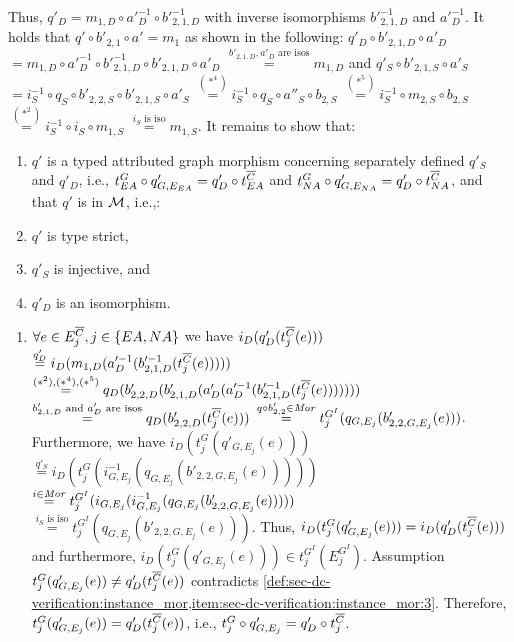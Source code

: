 \begin{description}
\begin{description}
Thus, $q'_D=m_{1,D} \circ a'^{-1}_D \circ b'^{-1}_{2,1,D}$ with inverse isomorphisms $b'^{-1}_{2,1,D}$ and $a'^{-1}_D$.
It holds that $q' \circ b'_{2,1} \circ a'=m_1$ as shown in the following: $q'_D \circ b'_{2,1,D} \circ a'_D$ $=m_{1,D} \circ a'^{-1}_D \circ b'^{-1}_{2,1,D} \circ b'_{2,1,D} \circ a'_D$ $\stackrel{b'_{2,1,D},a'_D\text{ are isos}}{=} m_{1,D}$ and $q'_S \circ b'_{2,1,S} \circ a'_S$ $=i^{-1}_S \circ q_S \circ b'_{2,2,S} \circ b'_{2,1,S} \circ a'_S$ $\stackrel{(*^4)}{=} i^{-1}_S \circ q_S \circ a''_S \circ b_{2,S}$ $\stackrel{(*^5)}{=} i^{-1}_S \circ m_{2,S} \circ b_{2,S}$ $\stackrel{(*^2)}{=} i^{-1}_S \circ i_S \circ m_{1,S}$ $\stackrel{i_S\text{ is iso}}{=} m_{1,S}$.
It remains to show that:
\begin{enumerate}
  \item $q'$ is a typed attributed graph morphism concerning separately defined $q'_S$ and $q'_D$, i.e., $t^G_{EA} \circ q'_{G,E_{EA}}=q'_D \circ t^{\overline{C}}_{EA}$ and $t^G_{NA} \circ q'_{G,E_{NA}}=q'_D \circ t^{\overline{C}}_{NA}$, and that $q'$ is in ${\cal M}$, i.e.,:
  \item $q'$ is type strict,
  \item $q'_S$ is injective, and
  \item $q'_D$ is an isomorphism.
\end{enumerate}
\begin{enumerate}
  \item $\forall e \in E^{\overline{C}}_j,j \in \{EA,NA\}$ we have $i_D(q'_D(t_j^{\overline{C}}(e)))$ $\stackrel{q'_D}{=} i_D(m_{1,D}(a'^{-1}_D(b'^{-1}_{2,1,D}(t_j^{\overline{C}}(e)))))$ $\stackrel{(*^2),(*^4),(*^5)}{=} q_D(b'_{2,2,D}(b'_{2,1,D}(a'_D(a'^{-1}_D(b'^{-1}_{2,1,D}(t_j^{\overline{C}}(e)))))))$ $\stackrel{b'_{2,1,D}\text{ and }a'_D\text{ are isos}}{=} q_D(b'_{2,2,D}(t_j^{\overline{C}}(e)))$ $\stackrel{q \circ b'_{2,2} \in \mathit{Mor}}{=} t_j^{G^I}(q_{G,E_j}(b'_{2,2,G,E_j}(e)))$.
  Furthermore, we have $i_D(t^G_j(q'_{G,E_j}(e)))$ $\stackrel{q'_S}{=} i_D(t^G_j(i^{-1}_{G,E_j}(q_{G,E_j}(b'_{2,2,G,E_j}(e)))))$ $\stackrel{i \in \mathit{Mor}}{=} t^{G^I}_j(i_{G,E_j}(i^{-1}_{G,E_j}(q_{G,E_j}(b'_{2,2,G,E_j}(e)))))$ $\stackrel{i_S\text{ is iso}}{=} t^{G^I}_j(q_{G,E_j}(b'_{2,2,G,E_j}(e)))$.
  Thus, $i_D(t^G_j(q'_{G,E_j}(e)))=i_D(q'_D(t_j^{\overline{C}}(e)))$ and furthermore, $i_D(t^G_j(q'_{G,E_j}(e))) \in t^{G^I}_j(E_j^{G^I})$.
  Assumption $t^G_j(q'_{G,E_j}(e)) \neq q'_D(t_j^{\overline{C}}(e))$ contradicts \cref{def:sec-dc-verification:instance_mor,item:sec-dc-verification:instance_mor:3}.
  Therefore, $t^G_j(q'_{G,E_j}(e)) = q'_D(t_j^{\overline{C}}(e))$, i.e., $t^G_j \circ q'_{G,E_j} = q'_D \circ t_j^{\overline{C}}$.

\end{enumerate}
\end{description}
\end{description}
